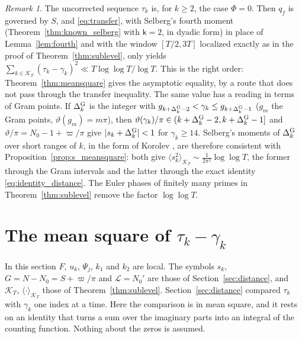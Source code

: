 \documentclass[11pt,a4paper]{article}
\makeatletter
\numberwithin{equation}{section}
\DeclareRobustCommand{\CGref}[1]{\ref{#1}}
\DeclareRobustCommand{\CGeqref}[1]{\eqref{#1}}
\DeclareRobustCommand{\CGcite}[2][]{\if\relax\detokenize{#1}\relax\cite{#2}\else\cite[#1]{#2}\fi}
\let\CG@origref\ref
\let\CG@origeqref\eqref
\newcommand{\CG@gettip}[1]{\@ifundefined{CGTip@#1}{#1}{\csname CGTip@#1\endcsname}}
\newcommand{\CG@getbib}[1]{\@ifundefined{CGBib@#1}{#1}{\csname CGBib@#1\endcsname}}
\DeclareRobustCommand{\CGref}[1]{\pdftooltip{\CG@origref{#1}}{\CG@gettip{#1}}}
\DeclareRobustCommand{\CGeqref}[1]{\pdftooltip{\CG@origeqref{#1}}{\CG@gettip{#1}}}
\DeclareRobustCommand{\CGcite}[2][]{\pdftooltip{\if\relax\detokenize{#1}\relax\cite{#2}\else\cite[#1]{#2}\fi}{\CG@getbib{#2}}}
\theoremstyle{definition}
\theoremstyle{remark}
\newtheorem{remark}[theorem]{Remark}
\newcommand{\Nz}{N_0} %
\newcommand{\lL}{\mathcal L}
\newcommand{\Ph}{\Phi}
\newcommand{\Kc}{\mathcal K}
\makeatother
\begin{document}
\begin{remark}\label{rem:bare_point}
The uncorrected sequence $\tau_k$ is, for $k\ge2$, the case $\Ph=0$. Then $q_f$ is governed by $S$, and \CGeqref{eq:transfer}, with Selberg's fourth moment (Theorem~\CGref{thm:known_selberg} with $\mathsf k=2$, in dyadic form) in place of Lemma~\CGref{lem:fourth} and with the window $[T/2,3T]$ localized exactly as in the proof of Theorem~\CGref{thm:sublevel}, only yields $\sum_{k\in\Kc_T}(\tau_k-\gamma_k)^2\ll T\log\log T/\log T$. This is the right order: Theorem~\CGref{thm:meansquare} gives the asymptotic equality, by a route that does not pass through the transfer inequality. The same value has a reading in terms of Gram points. If $\Delta^{\rm G}_k$ is the integer with $g_{k+\Delta^{\rm G}_k-2}<\gamma_k\le g_{k+\Delta^{\rm G}_k-1}$ ($g_m$ the Gram points, $\vartheta(g_m)=m\pi$), then $\vartheta(\gamma_k)/\pi\in(k+\Delta^{\rm G}_k-2,k+\Delta^{\rm G}_k-1]$ and $\vartheta/\pi=\Nz-1+\varpi/\pi$ give $|s_k+\Delta^{\rm G}_k|<1$ for $\gamma_k\ge14$. Selberg's moments of $\Delta^{\rm G}_k$ over short ranges of $k$, in the form of Korolev \CGcite[Thm.~4.2]{Korolev2012}, are therefore consistent with Proposition~\CGref{prop:s_meansquare}: both give $\langle s_k^2\rangle_{\Kc_T}\sim\frac1{2\pi^2}\log\log T$, the former through the Gram intervals and the latter through the exact identity \CGeqref{eq:identity_distance}. The Euler phases of finitely many primes in Theorem~\CGref{thm:sublevel} remove the factor $\log\log T$.
\end{remark}

\section{The mean square of \texorpdfstring{$\tau_k-\gamma_k$}{tau\_k - gamma\_k}}\label{sec:meansquare}

In this section $F$, $u_k$, $\Psi_j$, $k_1$ and $k_2$ are local. The symbols $s_k$, $G=N-\Nz=S+\varpi/\pi$ and $\lL=\Nz'$ are those of Section~\CGref{sec:distance}, and $\Kc_T$, $\langle\cdot\rangle_{\Kc_T}$ those of Theorem~\CGref{thm:sublevel}. Section~\CGref{sec:distance} compared $\tau_k$ with $\gamma_k$ one index at a time. Here the comparison is in mean square, and it rests on an identity that turns a sum over the imaginary parts into an integral of the counting function. Nothing about the zeros is assumed.
\end{document}

